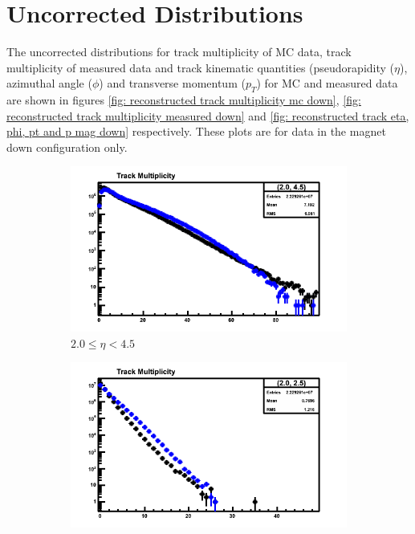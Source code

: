 \section{Uncorrected Distributions}
\label{section: uncorrected_distributions}

The uncorrected distributions for track multiplicity of MC data, track multiplicity of measured data and track kinematic quantities (pseudorapidity ($\eta$), azimuthal angle ($\phi$) and transverse momentum ($p_T$) for MC and measured data are shown in figures \ref{fig: reconstructed track multiplicity mc down},  \ref{fig: reconstructed track multiplicity measured down} and \ref{fig: reconstructed track eta, phi, pt and p mag down} respectively. These plots are for data in the magnet down configuration only.

\begin{figure}[h]
	\begin{subfigure}[h]{0.32\textwidth}
		\includegraphics[width=\textwidth]{./Chapters/multiplicity/images/reconstructed_multiplicity_2_0_4_5_mc_down.png}
		\caption{$2.0 \le \eta < 4.5$}
		\label{fig: reconstructed track multiplicity mc down 2.0 - 4.5}
	\end{subfigure}
	\begin{subfigure}[h]{0.32\textwidth}
		\includegraphics[width=\textwidth]{./Chapters/multiplicity/images/reconstructed_multiplicity_2_0_2_5_mc_down.png}

\end{subfigure}
\end{figure}
